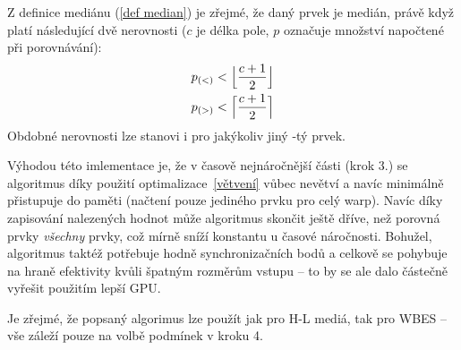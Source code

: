     Z definice mediánu (\ref{def median}) je zřejmé, že daný prvek je medián, právě když platí následující dvě nerovnosti ($c$ je délka pole, $p$ označuje množství napočtené při porovnávání):
    \begin{align}
      p_{(<)} < \Big\lfloor\frac{c+1}{2}\Big\rfloor \notag \\
      p_{(>)} < \Big\lceil\frac{c+1}{2}\Big\rceil \notag
    \end{align}
    Obdobné nerovnosti lze stanovi i pro jakýkoliv jiný \kk-tý prvek.

    Výhodou této imlementace je, že v časově nejnáročnější části (krok 3.) se algoritmus díky použití optimalizace~\ref{větvení} vůbec nevětví a navíc minimálně přistupuje do paměti (načtení pouze jediného prvku pro celý warp). Navíc díky zapisování nalezených hodnot může algoritmus skončit ještě dříve, než porovná prvky \emph{všechny} prvky, což mírně sníží konstantu u časové náročnosti. Bohužel, algoritmus taktéž potřebuje hodně synchronizačních bodů a celkově se pohybuje na hraně efektivity kvůli špatným rozměrům vstupu -- to by se ale dalo částečně vyřešit použitím lepší GPU.

    Je zřejmé, že popsaný algorimus lze použít jak pro H-L mediá, tak pro WBES -- vše záleží pouze na volbě podmínek v kroku 4.
